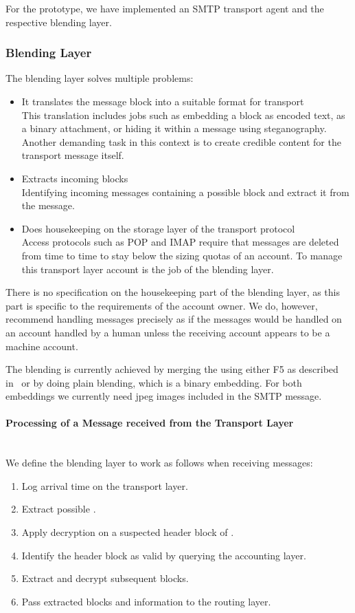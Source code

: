 For the prototype, we have implemented an SMTP transport agent and the respective blending layer.

\subsubsection{Blending Layer}\label{sec:blendingLayer}
The blending layer solves multiple problems:
\begin{itemize}
	\item It translates the message block into a suitable format for transport\\
	This translation includes jobs such as embedding a block as encoded text, as a binary attachment, or hiding it within a message using steganography. Another demanding task in this context is to create credible content for the transport message itself.
	\item Extracts incoming blocks\\
	Identifying incoming messages containing a possible block and extract it from the message.
	\item Does housekeeping on the storage layer of the transport protocol\\
	Access protocols such as POP and IMAP require that messages are deleted from time to time to stay below the sizing quotas of an account. To manage this transport layer account is the job of the blending layer.
\end{itemize}

There is no specification on the housekeeping part of the blending layer, as this part is specific to the requirements of the account owner. We do, however, recommend handling messages precisely as if the messages would be handled on an account handled by a human unless the receiving account appears to be a machine account. 

The blending is currently achieved by merging the \VortexMessage{} using either F5 as described in~\cite{f5} or by doing plain blending, which is a binary embedding. For both embeddings we  currently need jpeg images included in the SMTP message. 

\paragraph{Processing of a Message received from the Transport Layer}~\\
We define the blending layer to work as follows when receiving messages:
\begin{enumerate}
	\item Log arrival time on the transport layer.
	\item Extract possible \VortexMessage.
	\item Apply decryption on a suspected header block of \VortexMessage.
	\item Identify the header block as valid by querying the accounting layer.
	\item Extract and decrypt subsequent blocks.
	\item Pass extracted blocks and information to the routing layer.
\end{enumerate}

